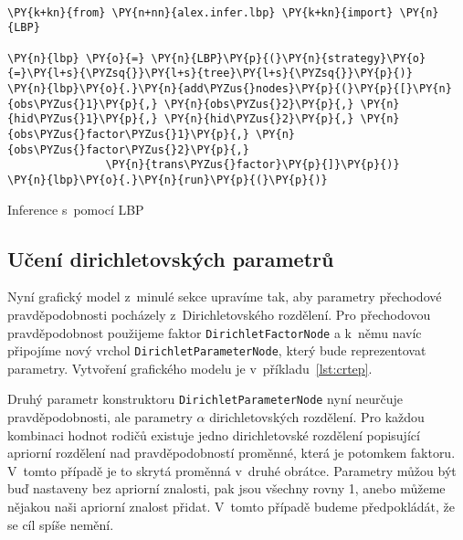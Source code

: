 \begin{example}
\begin{Verbatim}[commandchars=\\\{\}]

\PY{k+kn}{from} \PY{n+nn}{alex.infer.lbp} \PY{k+kn}{import} \PY{n}{LBP}

\PY{n}{lbp} \PY{o}{=} \PY{n}{LBP}\PY{p}{(}\PY{n}{strategy}\PY{o}{=}\PY{l+s}{\PYZsq{}}\PY{l+s}{tree}\PY{l+s}{\PYZsq{}}\PY{p}{)}
\PY{n}{lbp}\PY{o}{.}\PY{n}{add\PYZus{}nodes}\PY{p}{(}\PY{p}{[}\PY{n}{obs\PYZus{}1}\PY{p}{,} \PY{n}{obs\PYZus{}2}\PY{p}{,} \PY{n}{hid\PYZus{}1}\PY{p}{,} \PY{n}{hid\PYZus{}2}\PY{p}{,} \PY{n}{obs\PYZus{}factor\PYZus{}1}\PY{p}{,} \PY{n}{obs\PYZus{}factor\PYZus{}2}\PY{p}{,}
               \PY{n}{trans\PYZus{}factor}\PY{p}{]}\PY{p}{)}
\PY{n}{lbp}\PY{o}{.}\PY{n}{run}\PY{p}{(}\PY{p}{)}
\end{Verbatim}
\caption{Inference s~pomocí LBP}
\label{lst:lbpex}
\end{example}

%

\subsection{Učení dirichletovských parametrů}

Nyní grafický model z~minulé sekce upravíme tak, aby parametry přechodové pravděpodobnosti pocházely z~Dirichletovského rozdělení.
Pro přechodovou pravděpodobnost použijeme faktor \texttt{DirichletFactorNode} a k~němu navíc připojíme nový vrchol \texttt{DirichletParameterNode}, který bude reprezentovat parametry.
Vytvoření grafického modelu je v~příkladu~\ref{lst:crtep}.

Druhý parametr konstruktoru \texttt{DirichletParameterNode} nyní neurčuje pravděpodobnosti, ale parametry $\alpha$ dirichletovských rozdělení.
Pro každou kombinaci hodnot rodičů existuje jedno dirichletovské rozdělení popisující apriorní rozdělení nad pravděpodobností proměnné, která je potomkem faktoru.
V~tomto případě je to skrytá proměnná v~druhé obrátce.
Parametry můžou být buď nastaveny bez apriorní znalosti, pak jsou všechny rovny 1, anebo můžeme nějakou naši apriorní znalost přidat.
V~tomto případě budeme předpokládát, že se cíl spíše nemění.

